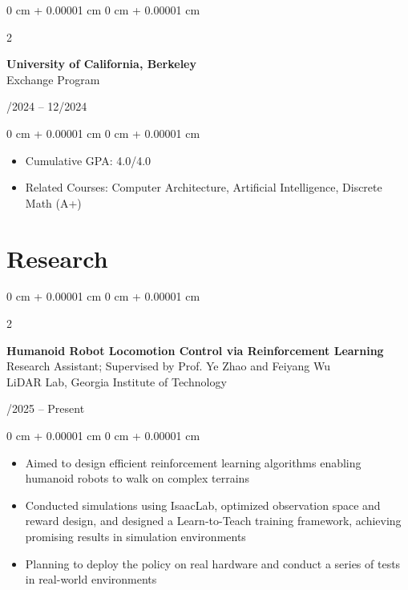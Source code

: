 \documentclass[10pt, letterpaper]{article}
\newenvironment{highlights}{
    \begin{itemize}[
        topsep=0.10 cm,
        parsep=0.10 cm,
        partopsep=0pt,
        itemsep=0pt,
        leftmargin=0 cm + 10pt
    ]
}{
    \end{itemize}
} %
\newenvironment{onecolentry}{
    \begin{adjustwidth}{
        0 cm + 0.00001 cm
    }{
        0 cm + 0.00001 cm
    }
}{
    \end{adjustwidth}
} %
\newenvironment{twocolentry}[2][]{
    \onecolentry
    \def\secondColumn{#2}
    \setcolumnwidth{\fill, 4.5 cm}
    \begin{paracol}{2}
}{
    \switchcolumn \raggedleft \secondColumn
    \end{paracol}
    \endonecolentry
} %
\begin{document}
        \vspace{0.2 cm}

        \begin{twocolentry}{
            08/2024 -- 12/2024
        }
            \textbf{University of California, Berkeley}\\
            Exchange Program
        \end{twocolentry}

        \vspace{0.10 cm}
        \begin{onecolentry}
            \begin{highlights}
                \item Cumulative GPA: 4.0/4.0
                \item Related Courses: Computer Architecture, Artificial Intelligence, Discrete Math (A+)
            \end{highlights}
        \end{onecolentry}



    
    \section{Research}

        \begin{twocolentry}{
            05/2025 -- Present
        }
            \textbf{Humanoid Robot Locomotion Control via Reinforcement Learning}\\
            Research Assistant; Supervised by Prof. Ye Zhao and Feiyang Wu\\
            LiDAR Lab, Georgia Institute of Technology
        \end{twocolentry}

        \vspace{0.10 cm}
        \begin{onecolentry}
            \begin{highlights}
                \item Aimed to design efficient reinforcement learning algorithms enabling humanoid robots to walk on complex terrains
                \item Conducted simulations using IsaacLab, optimized observation space and reward design, and designed a Learn-to-Teach training framework, achieving promising results in simulation environments
                \item Planning to deploy the policy on real hardware and conduct a series of tests in real-world environments
            \end{highlights}
        \end{onecolentry}
\end{document}
